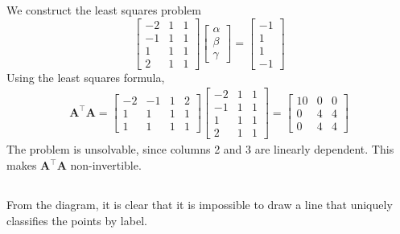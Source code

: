 \documentclass[]{article}
\newcommand{\tpose}[1]{#1^{\! \top} \!}
\begin{document}
We construct the least squares problem
\begin{equation}
	\begin{bmatrix}
	-2 & 1 & 1 \\
	-1 & 1 & 1 \\
	1 & 1 & 1 \\
	2 & 1 & 1
	\end{bmatrix}
	\begin{bmatrix}
	\alpha \\
	\beta \\
	\gamma
	\end{bmatrix}
	=
	\begin{bmatrix}
	-1 \\
	1 \\
	1 \\
	-1
	\end{bmatrix}
\end{equation}
Using the least squares formula,
\begin{align}
	\tpose{\bm{A}} \bm{A} =
	\begin{bmatrix}
	-2 & -1 & 1 & 2 \\
	1 & 1 & 1 & 1 \\
	1 & 1 & 1 & 1
	\end{bmatrix}
	\begin{bmatrix}
	-2 & 1 & 1 \\
	-1 & 1 & 1 \\
	1 & 1 & 1 \\
	2 & 1 & 1
	\end{bmatrix}
	=
	\begin{bmatrix}
	10 & 0 & 0 \\
	0 & 4 & 4 \\
	0 & 4 & 4
	\end{bmatrix}
\end{align}
The problem is unsolvable, since columns 2 and 3 are linearly dependent.
This makes \(\tpose{\bm{A}} \bm{A}\) non-invertible.

\subsection{}

\begin{center}
\end{center}
From the diagram, it is clear that it is impossible to draw a line that uniquely classifies the points by label.
\end{document}
